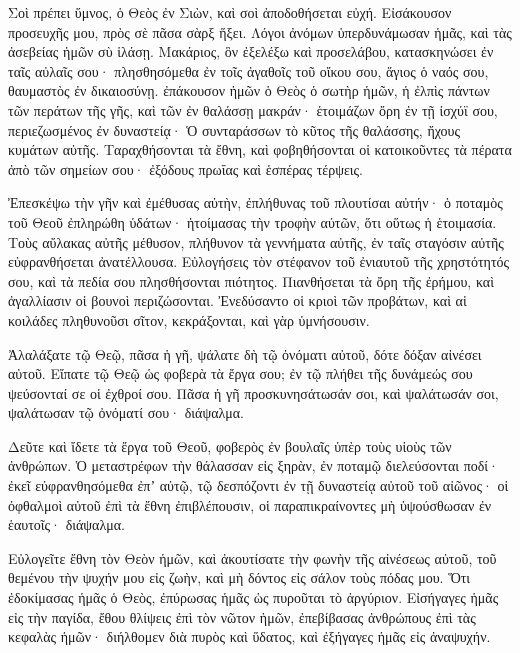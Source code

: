 \begin{spacing}{1.1}
\begin{multicols}{2}
Σοὶ πρέπει ὕμνος, ὁ Θεὸς ἐν Σιὼν, καὶ σοὶ ἀποδοθήσεται εὐχή.
Εἰσάκουσον προσευχῆς μου, πρὸς σὲ πᾶσα σὰρξ ἥξει.
Λόγοι ἀνόμων ὑπερδυνάμωσαν ἡμᾶς, καὶ τὰς ἀσεβείας ἡμῶν σὺ ἱλάσῃ.
Μακάριος, ὃν ἐξελέξω καὶ προσελάβου, κατασκηνώσει ἐν ταῖς αὐλαῖς σου· πλησθησόμεθα ἐν τοῖς ἀγαθοῖς τοῦ οἴκου σου, ἅγιος ὁ ναός σου,
θαυμαστὸς ἐν δικαιοσύνῃ. ἐπάκουσον ἡμῶν ὁ Θεὸς ὁ σωτὴρ ἡμῶν, ἡ ἐλπὶς πάντων τῶν περάτων τῆς γῆς, καὶ τῶν ἐν θαλάσσῃ μακράν·
ἑτοιμάζων ὄρη ἐν τῇ ἰσχύϊ σου, περιεζωσμένος ἐν δυναστείᾳ·
Ὁ συνταράσσων τὸ κῦτος τῆς θαλάσσης, ἤχους κυμάτων αὐτῆς. Ταραχθήσονται τὰ ἔθνη,
καὶ φοβηθήσονται οἱ κατοικοῦντες τὰ πέρατα ἀπὸ τῶν σημείων σου· ἐξόδους πρωΐας καὶ ἑσπέρας τέρψεις.

Ἐπεσκέψω τὴν γῆν καὶ ἐμέθυσας αὐτὴν, ἐπλήθυνας τοῦ πλουτίσαι αὐτήν· ὁ ποταμὸς τοῦ Θεοῦ ἐπληρώθη ὑδάτων· ἡτοίμασας τὴν τροφὴν αὐτῶν, ὅτι οὕτως ἡ ἑτοιμασία.
Τοὺς αὔλακας αὐτῆς μέθυσον, πλήθυνον τὰ γεννήματα αὐτῆς, ἐν ταῖς σταγόσιν αὐτῆς εὐφρανθήσεται ἀνατέλλουσα.
Εὐλογήσεις τὸν στέφανον τοῦ ἐνιαυτοῦ τῆς χρηστότητός σου, καὶ τὰ πεδία σου πλησθήσονται πιότητος.
Πιανθήσεται τὰ ὄρη τῆς ἐρήμου, καὶ ἀγαλλίασιν οἱ βουνοὶ περιζώσονται.
Ἐνεδύσαντο οἱ κριοὶ τῶν προβάτων, καὶ αἱ κοιλάδες πληθυνοῦσι σῖτον, κεκράξονται, καὶ γὰρ ὑμνήσουσιν.

Ἀλαλάξατε τῷ Θεῷ, πᾶσα ἡ γῆ,
ψάλατε δὴ τῷ ὀνόματι αὐτοῦ, δότε δόξαν αἰνέσει αὐτοῦ.
Εἴπατε τῷ Θεῷ ὡς φοβερὰ τὰ ἔργα σου; ἐν τῷ πλήθει τῆς δυνάμεώς σου ψεύσονταί σε οἱ ἐχθροί σου.
Πᾶσα ἡ γῆ προσκυνησάτωσάν σοι, καὶ ψαλάτωσάν σοι, ψαλάτωσαν τῷ ὀνόματί σου· διάψαλμα.

Δεῦτε καὶ ἴδετε τὰ ἔργα τοῦ Θεοῦ, φοβερὸς ἐν βουλαῖς ὑπὲρ τοὺς υἱοὺς τῶν ἀνθρώπων.
Ὁ μεταστρέφων τὴν θάλασσαν εἰς ξηρὰν, ἐν ποταμῷ διελεύσονται ποδί· ἐκεῖ εὐφρανθησόμεθα ἐπʼ αὐτῷ,
τῷ δεσπόζοντι ἐν τῇ δυναστείᾳ αὐτοῦ τοῦ αἰῶνος· οἱ ὀφθαλμοὶ αὐτοῦ ἐπὶ τὰ ἔθνη ἐπιβλέπουσιν, οἱ παραπικραίνοντες μὴ ὑψούσθωσαν ἐν ἑαυτοῖς· διάψαλμα.

Εὐλογεῖτε ἔθνη τὸν Θεὸν ἡμῶν, καὶ ἀκουτίσατε τὴν φωνὴν τῆς αἰνέσεως αὐτοῦ,
τοῦ θεμένου τὴν ψυχήν μου εἰς ζωὴν, καὶ μὴ δόντος εἰς σάλον τοὺς πόδας μου.
Ὅτι ἐδοκίμασας ἡμᾶς ὁ Θεὸς, ἐπύρωσας ἡμᾶς ὡς πυροῦται τὸ ἀργύριον.
Εἰσήγαγες ἡμᾶς εἰς τὴν παγίδα, ἔθου θλίψεις ἐπὶ τὸν νῶτον ἡμῶν,
ἐπεβίβασας ἀνθρώπους ἐπὶ τὰς κεφαλὰς ἡμῶν· διήλθομεν διὰ πυρὸς καὶ ὕδατος, καὶ ἐξήγαγες ἡμᾶς εἰς ἀναψυχήν.


\end{multicols}
\end{spacing}

